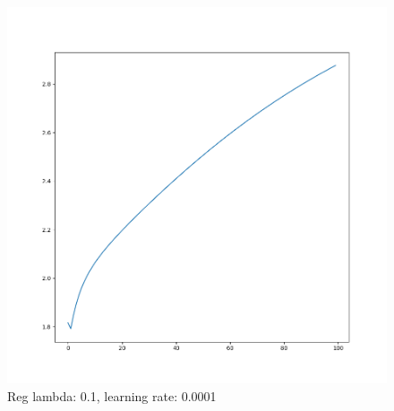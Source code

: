 \documentclass[11pt]{article}
\begin{document}
\begin{figure}[h]
\begin{minipage}{0.5 \textwidth}
		\includegraphics[width=1 \textwidth]{figure/HOG_Log_Loss_Reg-0.1_CV.png}
		\caption{Reg lambda: 0.1, learning rate: 0.0001}
		\label{fig:HOG_Log_Loss_Reg-0.1_CV}
	\end{minipage}
\end{figure}
\end{document}

